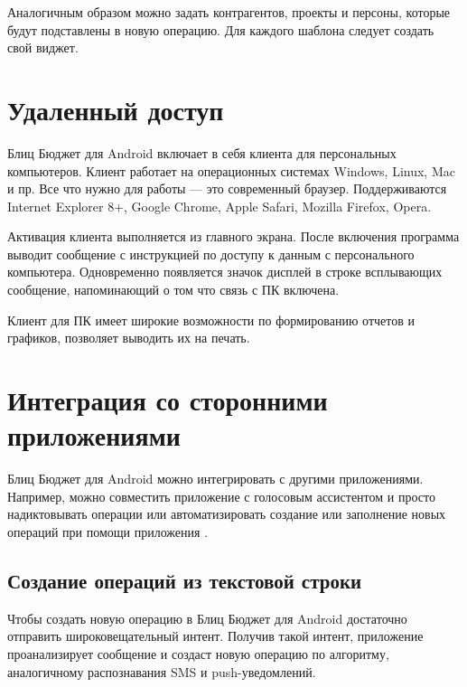 \documentclass[a4paper,10pt,russian]{sphinxmanual}
\begin{document}
Аналогичным образом можно задать контрагентов, проекты и персоны, которые будут подставлены в новую операцию. Для каждого
шаблона следует создать свой виджет.


\chapter{Удаленный доступ}
\label{\detokenize{remote-access:chapter-remote-access}}\label{\detokenize{remote-access:id1}}\label{\detokenize{remote-access::doc}}
Блиц Бюджет для Android включает в себя клиента для персональных компьютеров. Клиент работает на операционных системах
Windows, Linux, Mac и пр. Все что нужно для работы — это современный браузер. Поддерживаются Internet
Explorer 8+, Google Chrome, Apple Safari, Mozilla Firefox, Opera.

\noindent{}

\noindent{}

\noindent{}

Активация клиента выполняется из главного экрана. После включения программа выводит сообщение с инструкцией
по доступу к данным с персонального компьютера. Одновременно появляется значок дисплей в строке всплывающих
сообщение, напоминающий о том что связь с ПК включена.

Клиент для ПК имеет широкие возможности по формированию отчетов и графиков, позволяет выводить их на печать.


\chapter{Интеграция со сторонними приложениями}
\label{\detokenize{api:chapter-api}}\label{\detokenize{api:id1}}\label{\detokenize{api::doc}}
Блиц Бюджет для Android можно интегрировать с другими приложениями. Например, можно совместить приложение с голосовым
ассистентом и просто надиктовывать операции или автоматизировать создание или заполнение новых операций при помощи
приложения .


\section{Создание операций из текстовой строки}
\label{\detokenize{api:id2}}
Чтобы создать новую операцию в Блиц Бюджет для Android достаточно отправить широковещательный интент. Получив такой
интент, приложение проанализирует сообщение и создаст новую операцию по алгоритму, аналогичному распознавания SMS
и push-уведомлений.
\end{document}
